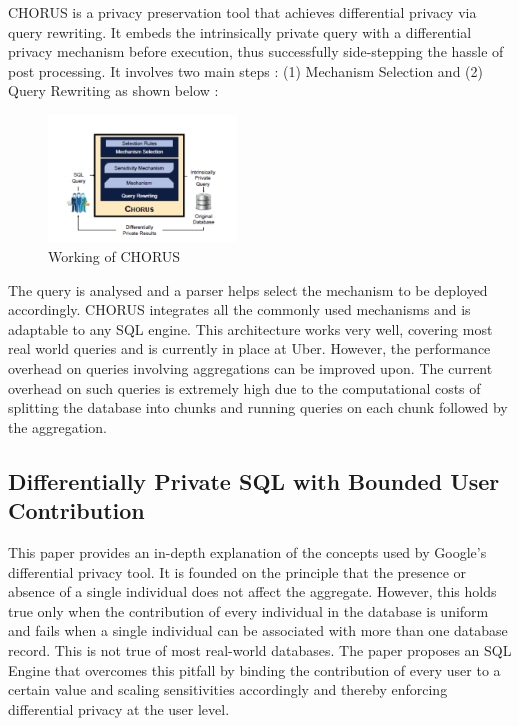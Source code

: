 \documentclass[acmsmall]{acmart}
\begin{document}
CHORUS is a privacy preservation tool that achieves differential privacy via query rewriting. It embeds the intrinsically private query with a differential privacy mechanism before execution, thus successfully side-stepping the hassle of post processing. It involves two main steps : (1) Mechanism Selection and (2) Query Rewriting as shown below :

\begin{figure}[htp]
    \centering
    \includegraphics[width=5cm]{Fig 2.1.1.png}
    \caption{Working of CHORUS}
    \label{fig:2.1.1}
\end{figure}

The query is analysed and a parser helps select the mechanism to be deployed accordingly. CHORUS integrates all the commonly used mechanisms and is adaptable to any SQL engine. This architecture works very well, covering most real world queries and is currently in place at Uber. However, the performance overhead on queries involving aggregations can be improved upon. The current overhead on such queries is extremely high due to the computational costs of splitting the database into chunks and running queries on each chunk followed by the aggregation.

\subsection{Differentially Private SQL with Bounded User Contribution}\label{2.2}
This paper\cite{wilson2019differentially} provides an in-depth explanation of the concepts used by Google's differential privacy tool. It is founded on the principle that the presence or absence of a single individual does not affect the aggregate. However, this holds true only when the contribution of every individual in the database is uniform and fails when a single individual can be associated with more than one database record. This is not true of most real-world databases. The paper proposes an SQL Engine that overcomes this pitfall by binding the contribution of every user to a certain value and scaling sensitivities accordingly and thereby enforcing differential privacy at the user level.
\end{document}
